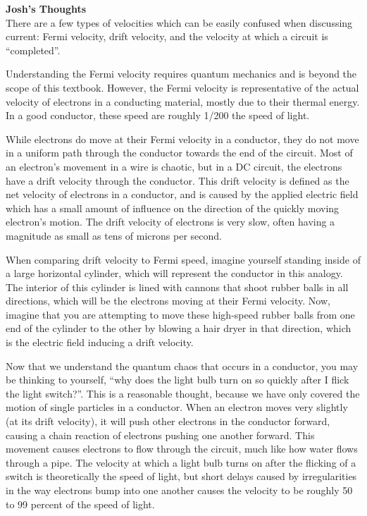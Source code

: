 \begin{framed}
\textbf{Josh's Thoughts}\\
There are a few types of velocities which can be easily confused when discussing current: Fermi velocity, drift velocity, and the velocity at which a circuit is ``completed''.

Understanding the Fermi velocity requires quantum mechanics and is beyond the scope of this textbook. However, the Fermi velocity is representative of the actual velocity of electrons in a conducting material, mostly due to their thermal energy. In a good conductor, these speed are roughly 1/200 the speed of light.

While electrons do move at their Fermi velocity in a conductor, they do not move in a uniform path through the conductor towards the end of the circuit. Most of an electron's movement in a wire is chaotic, but in a DC circuit, the electrons have a drift velocity through the conductor. This drift velocity is defined as the net velocity of electrons in a conductor, and is caused by the applied electric field which has a small amount of influence on the direction of the quickly moving electron's motion. The drift velocity of electrons is very slow, often having a magnitude as small as tens of microns per second.

When comparing drift velocity to Fermi speed, imagine yourself standing inside of a large horizontal cylinder, which will represent the conductor in this analogy. The interior of this cylinder is lined with cannons that shoot rubber balls in all directions, which will be the electrons moving at their Fermi velocity. Now, imagine that you are attempting to move these high-speed rubber balls from one end of the cylinder to the other by blowing a hair dryer in that direction, which is the electric field inducing a drift velocity.

Now that we understand the quantum chaos that occurs in a conductor, you may be thinking to yourself, ``why does the light bulb turn on so quickly after I flick the light switch?''. This is a reasonable thought, because we have only covered the motion of single particles in a conductor. When an electron moves very slightly (at its drift velocity), it will push other electrons in the conductor forward, causing a chain reaction of electrons pushing one another forward. This movement causes electrons to flow through the circuit, much like how water flows through a pipe. The velocity at which a light bulb turns on after the flicking of a switch is theoretically the speed of light, but short delays caused by irregularities in the way electrons bump into one another causes the velocity to be roughly 50 to 99 percent of the speed of light.
\end{framed}

